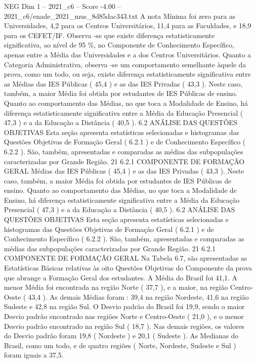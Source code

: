 \begin{textsample}{NEG Dim 1 – 2021\_c6 – Score -4.00 – 2021\_c6/enade\_2021\_mus\_8d85dac343.txt}
A nota Mínima foi zero para as Universidades, 4,2 para os Centros Universitários, 11,4 para as Faculdades, e 18,9 para os CEFET/IF.
Observa -se que existe diferença estatisticamente significativa, ao nível de 95 \%, no Componente de Conhecimento Específico, apenas entre a Média das Universidades e a dos Centros Universitários.
Quanto a Categoria Administrativa, observa -se um comportamento semelhante àquele da prova, como um todo, ou seja, existe diferença estatisticamente significativa entre as Médias das IES Públicas ( 45,4 ) e as das IES Privadas ( 43,3 ).
Neste caso, também, a maior Média foi obtida por estudantes de IES Públicas de ensino.
Quanto ao comportamento das Médias, no que toca a Modalidade de Ensino, há diferença estatisticamente significativa entre a Média da Educação Presencial ( 47,3 ) e a da Educação a Distância ( 40,5 ). 6.2 ANÁLISE DAS QUESTÕES OBJETIVAS Esta seção apresenta estatísticas selecionadas e histogramas das Questões Objetivas de Formação Geral ( 6.2.1 ) e de Conhecimento Específico ( 6.2.2 ).
São, também, apresentadas e comparadas as médias das subpopulações caracterizadas por Grande Região. 21 6.2.1 COMPONENTE DE FORMAÇÃO GERAL Médias das IES Públicas ( 45,4 ) e as das IES Privadas ( 43,3 ).
Neste caso, também, a maior Média foi obtida por estudantes de IES Públicas de ensino.
Quanto ao comportamento das Médias, no que toca a Modalidade de Ensino, há diferença estatisticamente significativa entre a Média da Educação Presencial ( 47,3 ) e a da Educação a Distância ( 40,5 ). 6.2 ANÁLISE DAS QUESTÕES OBJETIVAS Esta seção apresenta estatísticas selecionadas e histogramas das Questões Objetivas de Formação Geral ( 6.2.1 ) e de Conhecimento Específico ( 6.2.2 ).
São, também, apresentadas e comparadas as médias das subpopulações caracterizadas por Grande Região. 21 6.2.1 COMPONENTE DE FORMAÇÃO GERAL Na Tabela 6.7, são apresentadas as Estatísticas Básicas relativas às oito Questões Objetivas do Componente da prova que abrange a Formação Geral dos estudantes.
A Média do Brasil foi 41,1.
A menor Média foi encontrada na região Norte ( 37,7 ), e a maior, na região Centro-Oeste ( 43,4 ).
As demais Médias foram : 39,4 na região Nordeste, 41,6 na região Sudeste e 42,8 na região Sul.
O Desvio padrão do Brasil foi 19,9, sendo o maior Desvio padrão encontrado nas regiões Norte e Centro-Oeste ( 21,0 ), e o menor Desvio padrão encontrado na região Sul ( 18,7 ).
Nas demais regiões, os valores do Desvio padrão foram 19,8 ( Nordeste ) e 20,1 ( Sudeste ).
As Medianas do Brasil, como um todo, e de quatro regiões ( Norte, Nordeste, Sudeste e Sul ) foram iguais a 37,5.

\end{textsample}
